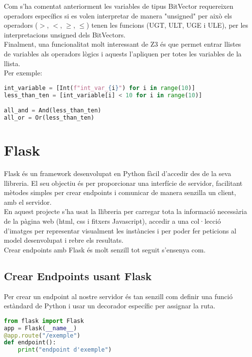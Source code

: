 Com s'ha comentat anteriorment les variables de tipus BitVector requereixen operadors específics si es volen interpretar de manera "unsigned" per això els operadors ($>$, $<$, $\geq$, $\leq$) tenen les funcions (UGT, ULT, UGE i ULE), per les interpretacions unsigned dels BitVectors.\\

Finalment, una funcionalitat molt interessant de Z3 és que permet entrar llistes de variables als operadors lògics i aquests l'apliquen per totes les variables de la llista.\\
Per exemple:

\begin{lstlisting}[language=Python, caption=Variable Declaration]
int_variable = [Int(f"int_var_{i}") for i in range(10)]
less_than_ten = [int_variable[i] < 10 for i in range(10)]

all_and = And(less_than_ten)
all_or = Or(less_than_ten)
\end{lstlisting}

\section{Flask}
Flask és un framework desenvolupat en Python fàcil d'accedir des de la seva llibreria. El seu objectiu és per proporcionar una interfície de servidor, facilitant mètodes simples per crear endpoints i comunicar de manera senzilla un client, amb el servidor.\\
En aquest projecte s'ha usat la llibreria per carregar tota la informació necessària de la pàgina web (html, css i fitxers Javascript), accedir a una col·lecció d'imatges per representar visualment les instàncies i per poder fer peticions al model desenvolupat i rebre els resultats.\\
Crear endpoints amb Flask és molt senzill tot seguit s'ensenya com.

\subsection{Crear Endpoints usant Flask}
Per crear un endpoint al nostre servidor és tan senzill com definir una funció estàndard de Python i usar un decorador específic per assignar la ruta.
\begin{lstlisting}[language=Python, caption=Declaració d'un endpoint]
from flask import Flask
app = Flask(__name__)
@app.route("/exemple")
def endpoint():
    print("endpoint d'exemple")
\end{lstlisting}

